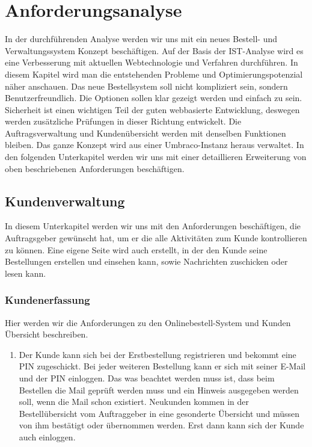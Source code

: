 \chapter{Anforderungsanalyse}

In der durchführenden Analyse werden wir uns mit ein neues Bestell- und Verwaltungssystem Konzept beschäftigen. Auf der Basis der IST-Analyse wird es eine Verbesserung mit aktuellen Webtechnologie und Verfahren durchführen.
In diesem Kapitel wird man die entstehenden Probleme und Optimierungspotenzial näher anschauen.
Das neue Bestellsystem soll nicht kompliziert sein, sondern Benutzerfreundlich. Die Optionen sollen klar gezeigt werden und einfach zu sein. Sicherheit ist einen wichtigen Teil der guten webbasierte Entwicklung, deswegen werden zusätzliche Prüfungen in dieser Richtung entwickelt.
Die Auftragsverwaltung und Kundenübersicht werden mit denselben Funktionen bleiben.
Das ganze Konzept wird aus einer Umbraco-Instanz heraus verwaltet.
In den folgenden Unterkapitel werden wir uns mit einer detaillieren Erweiterung von oben beschriebenen Anforderungen beschäftigen.

\section{Kundenverwaltung}

In diesem Unterkapitel werden wir uns mit den Anforderungen beschäftigen, die Auftragsgeber gewünscht hat, um er die alle Aktivitäten zum Kunde kontrollieren zu können. Eine eigene Seite wird auch erstellt, in der den Kunde seine Bestellungen erstellen und einsehen kann, sowie Nachrichten zuschicken oder lesen kann.

\subsection{Kundenerfassung}
Hier werden wir die Anforderungen zu den Onlinebestell-System und Kunden Übersicht beschreiben.
\begin{enumerate}
	\item Der Kunde kann sich bei der Erstbestellung registrieren und bekommt eine PIN zugeschickt. Bei jeder weiteren Bestellung kann er sich mit seiner E-Mail und der PIN einloggen. Das was beachtet werden muss ist, dass beim Bestellen die Mail geprüft werden muss und ein Hinweis ausgegeben werden soll, wenn die Mail schon existiert. Neukunden kommen in der Bestellübersicht vom Auftraggeber in eine gesonderte Übersicht und müssen von ihm bestätigt oder übernommen werden. Erst dann kann sich der Kunde auch einloggen.
\end{enumerate} 

